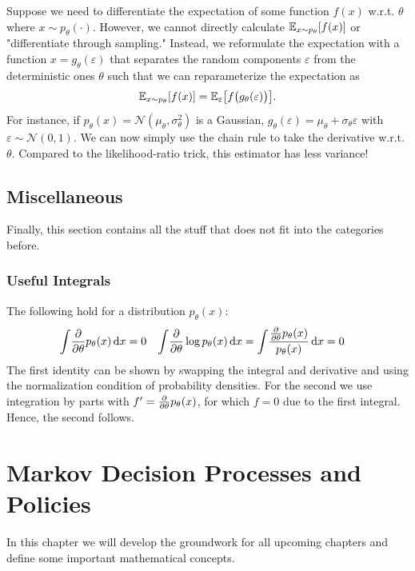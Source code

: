			Suppose we need to differentiate the expectation of some function \( f(x) \) w.r.t. \(\theta\) where \( x \sim p_\theta(\cdot) \). However, we cannot directly calculate \( \mathbb{E}_{x \sim p_\theta}[f(x)] \) or "differentiate through sampling." Instead, we reformulate the expectation with a function \( x = g_\theta(\varepsilon) \) that separates the random components \(\varepsilon\) from the deterministic ones \(\theta\) such that we can reparameterize the expectation as
			\begin{equation}
				\mathbb{E}_{x \sim p_\theta}[f(x)] = \mathbb{E}_\varepsilon\bigl[ f\bigl( g_\theta(\varepsilon) \bigr) \bigr].
			\end{equation}
			For instance, if \( p_\theta(x) = \mathcal{N}(\mu_\theta, \sigma_\theta^2) \) is a Gaussian, \( g_\theta(\varepsilon) = \mu_\theta + \sigma_\theta \varepsilon \) with \( \varepsilon \sim \mathcal{N}(0, 1) \). We can now simply use the chain rule to take the derivative w.r.t. \(\theta\). Compared to the likelihood-ratio trick, this estimator has less variance!

	\section{Miscellaneous}
		Finally, this section contains all the stuff that does not fit into the categories before.

		\subsection{Useful Integrals}
			The following hold for a distribution \( p_\theta(x) \):
			\begin{align}
				\int\! \pdv{\theta} p_\theta(x) \dd{x} &= 0 &
				\int\! \pdv{\theta} \log p_\theta(x) \dd{x} &= \int\! \frac{\pdv{\theta} p_\theta(x)}{p_\theta(x)} \dd{x} = 0
				\label{eq:usefulIntegrals}
			\end{align}
			The first identity can be shown by swapping the integral and derivative and using the normalization condition of probability densities. For the second we use integration by parts with \( f' = \pdv{\theta} p_\theta(x) \), for which \(f = 0\) due to the first integral. Hence, the second follows.

\chapter{Markov Decision Processes and Policies}
	In this chapter we will develop the groundwork for all upcoming chapters and define some important mathematical concepts.

